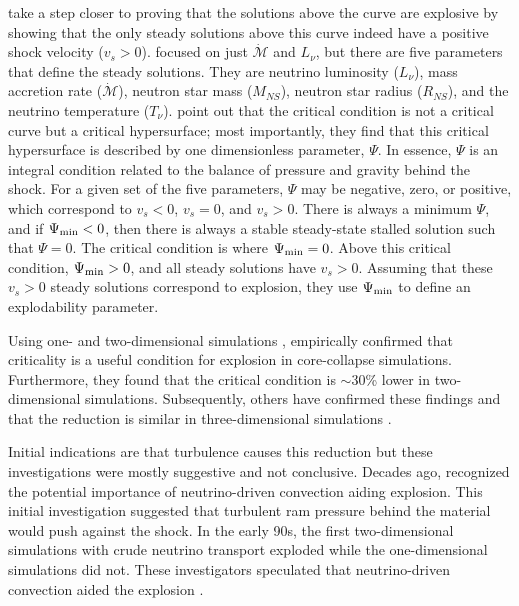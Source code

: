 \documentclass[twocolumn]{aastex6}
\begin{document}
\citet{murphy17} take a step closer to proving that the solutions above the curve
are explosive by showing that the only steady solutions above this curve indeed have a positive shock velocity ($v_s > 0$).  \citet{burrows93} focused on just $\dot{\mathcal{M}}$ and $L_\nu$, but there are
five parameters that define the steady solutions.  They are neutrino luminosity ($L_\nu$), mass accretion rate ($\dot{\mathcal{M}}$), neutron star mass ($M_{NS}$), neutron star radius ($R_{NS}$), and the neutrino temperature ($T_\nu$).
\citet{murphy17} point out that the critical condition is not a critical
curve but a critical hypersurface; most importantly, they find
that this critical hypersurface is described by one dimensionless
parameter, $\Psi$.  In essence, $\Psi$ is an integral condition related to
the balance of pressure and gravity behind the shock.  For a given set
of the five parameters, $\Psi$ may be negative, zero, or positive,
which correspond to $v_s < 0$, $v_s = 0$, and $v_s > 0$.  There is
always a minimum $\Psi$, and if $\Psi_{\rm min} < 0$, then there is
always a stable steady-state stalled solution such that $\Psi=0$.  The critical condition
is where $\Psi_{\rm min} = 0$.  Above this critical condition,
$\Psi_{\rm min} > 0$, and all steady solutions have $v_s > 0$.
Assuming that these $v_s > 0$ steady solutions correspond to
explosion, they use $\Psi_{\rm min}$ to define an explodability
parameter. 

Using one- and two-dimensional simulations \citet{murphy08b},
empirically confirmed that criticality is a useful condition for explosion in
core-collapse simulations.  Furthermore, they found that the critical condition is $\sim$30\%
lower in two-dimensional simulations.  Subsequently, others have confirmed these
findings and that the reduction is similar in three-dimensional simulations \citep{fernandez15,hanke12,dolence13,handy14}.

Initial indications are that turbulence causes this reduction but
these investigations were mostly suggestive and not
conclusive. Decades ago,
\citet{bethe90} recognized the potential importance of
neutrino-driven convection aiding explosion. This initial investigation suggested
that turbulent ram pressure behind the material would push against the
shock. In the early 90s, the first
two-dimensional simulations with crude neutrino
transport exploded while the one-dimensional
simulations did not. These investigators speculated that
neutrino-driven convection aided the explosion \citep{burrows95,janka96,janka01,colgate04}. 
  
\end{document}
